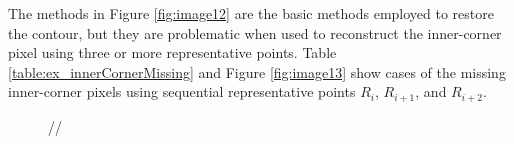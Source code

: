 
The methods in Figure \ref{fig:image12} are the basic methods employed to restore the contour, but they are problematic when used to reconstruct the inner-corner pixel using three or more representative points. Table \ref{table:ex_innerCornerMissing} and Figure \ref{fig:image13} show cases of the missing inner-corner pixels using sequential representative points $R_i$, $R_{i+1}$, and $R_{i+2}$.

\begin{figure}[htbp]
	\centering
	 //

\end{figure}
